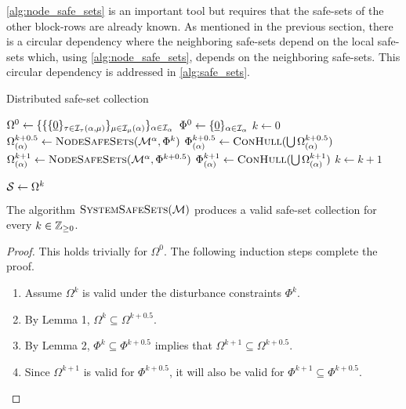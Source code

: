 \autoref{alg:node_safe_sets} is an important tool but requires that the safe-sets of the other block-rows are already known. As mentioned in the previous section, there is a circular dependency where the neighboring safe-sets depend on the local safe-sets which, using \autoref{alg:node_safe_sets}, depends on the neighboring safe-sets. This circular dependency is addressed in \autoref{alg:safe_sets}. 
\begin{algorithm}[t]
\caption{Distributed safe-set collection}\label{alg:safe_sets}
\begin{algorithmic}[1]
\State $\Omega^0\gets\{\{\{\underline{0}\}_{\tau\in\mathcal{I}_\tau(\alpha,{\mu})}\}_{{\mu}\in\mathcal{I}_{\mu}(\alpha)}\}_{\alpha\in\mathcal{I}_{\alpha}}$
\State $\Phi^0\gets\{\underline{0}\}_{\alpha\in\mathcal{I}_{\alpha}}$
\State $k\gets0$
\Repeat 
		\State $\Omega^{k+0.5}_{(\agentidx)}\gets\Call{NodeSafeSets}{\modes[\agentidx], \Phi^k}$
		\State $\Phi^{k+0.5}_{(\agentidx)}\gets\Call{ConHull}{\bigcup\Omega^{k+0.5}_{(\agentidx)}}$
	\EndParFor
		\State $\Omega^{k+1}_{(\agentidx)}\gets\Call{NodeSafeSets}{\modes[\agentidx], \Phi^{k+0.5}}$
		\State $\Phi^{k+1}_{(\agentidx)}\gets\Call{ConHull}{\bigcup\Omega^{k+1}_{(\agentidx)}}$
	\EndParFor
	\State $k\gets k+1$

\State $\mathcal{S}\gets\Omega^k$
\EndProcedure
\end{algorithmic}
\end{algorithm}



\begin{lemma}
The algorithm $\Call{SystemSafeSets}{\agents}$ produces a valid safe-set collection for every $k\in\mathbb{Z}_{\geq 0}$. 
\end{lemma}
\begin{proof}
This holds trivially for $\Omega^0$. The following induction steps complete the proof.
\begin{enumerate}
	\item Assume $\Omega^k$ is valid under the disturbance constraints $\Phi^k$.
	\item By Lemma 1, $\Omega^k\subseteq\Omega^{k+0.5}$.
	\item By Lemma 2, $\Phi^k\subseteq\Phi^{k+0.5}$ implies that $\Omega^{k+1}\subseteq\Omega^{k+0.5}$.
	\item Since $\Omega^{k+1}$ is valid for $\Phi^{k+0.5}$, it will also be valid for $\Phi^{k+1}\subseteq\Phi^{k+0.5}$.
\end{enumerate}
\end{proof}